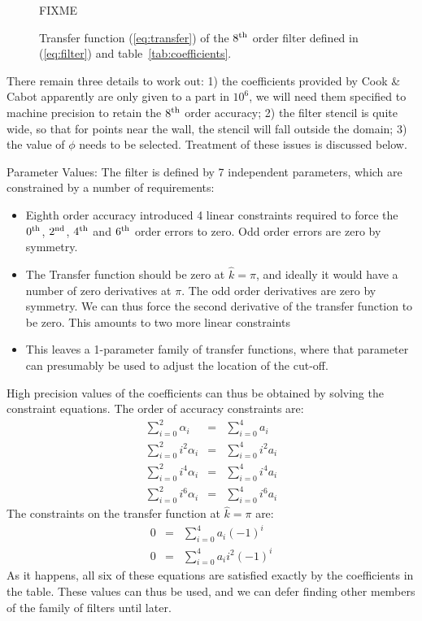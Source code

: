 \begin{figure}[t]
\begin{center}
FIXME
\end{center}
 \caption{Transfer function (\ref{eq:transfer}) of the $8^{\rm th}$ order filter defined in
 (\ref{eq:filter}) and table~\ref{tab:coefficients}.}
\label{fig:transfer}
\end{figure}

There remain three details to work out: 1) the coefficients provided by
Cook \& Cabot apparently are only given to a part in $10^6$, we will
need them specified to machine precision to retain the $8^{\rm th}$
order accuracy; 2) the filter stencil is quite wide, so that for points
near the wall, the stencil will fall outside the domain; 3) the value of
$\phi$ needs to be selected. Treatment of
these issues is discussed below.

Parameter Values: The filter is defined by 7 independent
parameters, which are constrained by a number of requirements:
\begin{itemize}
\item Eighth order accuracy introduced 4 linear constraints required to
      force the $0^{\rm th}$, $2^{\rm nd}$, $4^{\rm th}$ and $6^{\rm
      th}$
      order errors to zero. Odd order errors are zero by symmetry.
\item The Transfer function should be zero at $\hat k=\pi$, and ideally
      it would have a number of zero derivatives at $\pi$. The odd order
      derivatives are zero by symmetry. We can thus force the second
      derivative of the transfer function to be zero. This amounts to
      two more linear constraints
\item This leaves a 1-parameter family of transfer functions, where that
      parameter can presumably be used to adjust the location of the
      cut-off.
\end{itemize}
High precision values of the coefficients can thus be obtained by
solving the constraint equations. The order of accuracy constraints are:
\begin{eqnarray}
\sum_{i=0}^2\alpha_i&=&\sum_{i=0}^4a_i\\
\sum_{i=0}^2i^2\alpha_i&=&\sum_{i=0}^4i^2a_i\\
\sum_{i=0}^2i^4\alpha_i&=&\sum_{i=0}^4i^4a_i\\
\sum_{i=0}^2i^6\alpha_i&=&\sum_{i=0}^4i^6a_i
\end{eqnarray}
The constraints on the transfer function at $\hat k=\pi$ are:
\begin{eqnarray}
0&=&\sum_{i=0}^4a_i(-1)^i\\
0&=&\sum_{i=0}^4a_i i^2 (-1)^i
\end{eqnarray}
As it happens, all six of these equations are satisfied exactly by the
coefficients in the table. These values can thus be used, and we can defer finding other
members of the family of filters until later.

